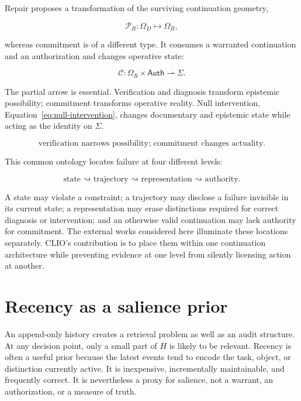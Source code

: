 \documentclass[11pt]{article}
\begin{document}
Repair proposes a transformation of the surviving continuation geometry,

\begin{equation}
\mathcal P_R:\Omega_D\longmapsto\Omega_R,
\end{equation}

whereas commitment is of a different type. It consumes a warranted continuation and an authorization and changes operative state:

\begin{equation}
\mathcal C:
\Omega_R\times\mathsf{Auth}
\rightharpoonup
\Sigma.
\end{equation}

The partial arrow is essential. Verification and diagnosis transform epistemic possibility; commitment transforms operative reality. Null intervention, Equation~\eqref{eq:null-intervention}, changes documentary and epistemic state while acting as the identity on $\Sigma$.

\begin{equation}
\boxed{
\text{verification narrows possibility; commitment changes actuality.}
}
\end{equation}

This common ontology locates failure at four different levels:

\begin{equation}
\text{state}
\rightsquigarrow
\text{trajectory}
\rightsquigarrow
\text{representation}
\rightsquigarrow
\text{authority}.
\end{equation}

A state may violate a constraint; a trajectory may disclose a failure invisible in its current state; a representation may erase distinctions required for correct diagnosis or intervention; and an otherwise valid continuation may lack authority for commitment. The external works considered here illuminate these locations separately. CLIO's contribution is to place them within one continuation architecture while preventing evidence at one level from silently licensing action at another.

\section{Recency as a salience prior}

An append-only history creates a retrieval problem as well as an audit structure. At any decision point, only a small part of $H$ is likely to be relevant. Recency is often a useful prior because the latest events tend to encode the task, object, or distinction currently active. It is inexpensive, incrementally maintainable, and frequently correct. It is nevertheless a proxy for salience, not a warrant, an authorization, or a measure of truth.
\end{document}
